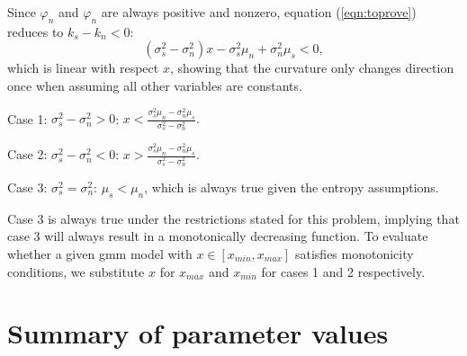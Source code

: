 {\begin{subappendices}
    Since $\varphi_n$ and  $\varphi_n$ are always positive and nonzero, equation (\ref{eqn:toprove}) reduces to $k_s - k_n < 0$:
    \begin{equation}
        (\sigma_s^2 - \sigma_n^2) x - \sigma_s^2\mu_n +\sigma_n^2\mu_s < 0,
    \end{equation}
    which is linear with respect $x$, showing that the curvature only changes direction once when assuming all other variables are constants. 
    
    Case 1: $\sigma_s^2 - \sigma_n^2 > 0$: $ x < \frac{\sigma_s^2\mu_n - \sigma_n^2\mu_s}{\sigma_s^2 - \sigma_n^2}.$
    
    Case 2: $\sigma_s^2 - \sigma_n^2 < 0$: $x > \frac{\sigma_s^2\mu_n - \sigma_n^2\mu_s}{\sigma_s^2 - \sigma_n^2}.$
    
    Case 3: $\sigma_s^2 = \sigma_n^2$: $\mu_s < \mu_n$, which is always true given the entropy assumptions.
    
    Case 3 is always true under the restrictions stated for this problem, implying that case 3 will always result in a monotonically decreasing function. To evaluate whether a given \ac{gmm} model with $x \in [x_{min}, x_{max}]$ satisfies monotonicity conditions, we substitute $x$ for $x_{max}$ and $x_{min}$ for cases 1 and 2 respectively.
    
      
    \section{Summary of parameter values}
    

\end{subappendices}}

